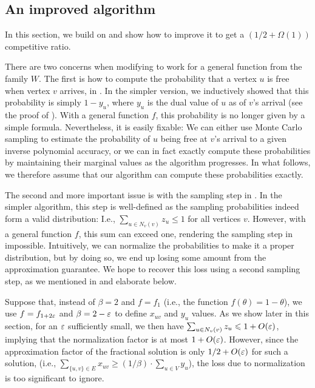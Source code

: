 \subsection{An improved algorithm}\label{sec:imrpoved-algorithm}

In this section, we build on  and show how to improve it to get a 
$(1/2 + \Omega(1))$ competitive ratio.

There are two concerns when modifying  to work for a general
function from the family $W$.
The first is how to compute the probability that a vertex $u$ is free when vertex $v$ arrives, 
in .
In the simpler version, we inductively showed that this probability is simply $1 - y_u$, where 
$y_u$ is the dual value of $u$ as of $v$'s arrival (see the proof of ). 
With a general function $f$, this probability is no longer given by a simple formula. 
Nevertheless, it is easily fixable: We can either use Monte Carlo sampling to estimate the 
probability of $u$ being free at $v$'s arrival to a given inverse polynomial accuracy, 
or we can in fact exactly compute these probabilities by maintaining their marginal values 
as the algorithm progresses. 
In what follows, we therefore assume that our algorithm can compute these probabilities 
exactly.

The second and more important issue is with the sampling step in .
In the simpler algorithm, this step is well-defined as the sampling probabilities indeed form a 
valid distribution: 
I.e., $\sum_{u \in N_v(v)}z_u \leq 1$ for all vertices $v$.
However, with a general function $f$, this sum can exceed one, rendering the sampling step in 
 impossible.
Intuitively, we can normalize the probabilities to make it a proper distribution, but by doing so,
we end up losing some amount from the approximation guarantee.
We hope to recover this loss using a second sampling step, as we mentioned in 
and elaborate below.

Suppose that, instead of $\beta = 2$ and $f = f_1$ (i.e., the function $f(\theta) = 1 - \theta$), 
we use $f = f_{1 + 2 \varepsilon}$ and $\beta = 2 - \varepsilon$ to define $x_{uv}$ and $y_u$ values.
As we show later in this section, for an $\varepsilon$ sufficiently small, we then have $\sum_{u \in N_v(v)} 
z_u \leqslant 1 + O(\varepsilon)$, implying that the normalization factor is at most $1 + O(\varepsilon)$.
However, since the approximation factor of the fractional solution is only $1/2 + O(\varepsilon)$ for such 
a solution, (i.e., $\sum_{\{u,v\} \in E} x_{uv} \geq (1/\beta) \cdot \sum_{u \in V} y_u$), the 
loss due to normalization is too significant to ignore.

